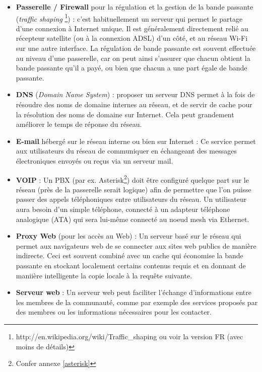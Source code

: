\documentclass[a4paper,french,11pt,twoside]{article}
\begin{document}
\medskip
\begin{itemize}
\renewcommand{\labelitemi}{$\bullet$}
     \item{\textbf{Passerelle / Firewall} pour la régulation et la gestion de la bande passante (\textit{traffic shaping} \footnote{http://en.wikipedia.org/wiki/Traffic\_shaping ou voir la version FR (avec moins de détails)}) : c'est habituellement un serveur qui permet le partage d'une connexion à Internet unique. Il est généralement directement relié au récepteur satellite (ou à la connexion ADSL) d'un côté, et au réseau Wi-Fi sur une autre interface. La régulation de bande passante est souvent effectuée au niveau d'une passerelle, car on peut ainsi s'assurer que chacun obtient la bande passante qu'il a payé, ou bien que chacun a une part égale de bande passante.}
     \item{\textbf{DNS} (\textit{Domain Name System}) : proposer un serveur DNS permet à la fois de résoudre des noms de domaine internes au réseau, et de servir de cache pour la résolution des noms de domaine sur Internet. Cela peut grandement améliorer le temps de réponse du réseau.}
     \item{\textbf{E-mail} hébergé sur le réseau interne ou bien sur Internet : Ce service permet aux utilisateurs du réseau de communiquer en échangeant des messages électroniques envoyés ou reçus via un serveur mail.}
     \item{\textbf{VOIP} : Un PBX (par ex. Asterisk\footnote{Confer annexe \ref{asterisk}}) doit être configuré quelque part sur le réseau (près de la passerelle serait logique) afin de permettre que l'on puisse passer des appels téléphoniques entre utilisateurs du réseau. Un utilisateur aura besoin d'un simple téléphone, connecté à un adapteur téléphone analogique (ATA) qui sera lui-même connecté au noeud mesh via Ethernet.}
     \item{\textbf{Proxy Web} (pour les accès au Web) : Un serveur basé sur le réseau qui permet aux navigateurs web de se connecter aux sites web publics de manière indirecte. Ceci est souvent combiné avec un cache qui économise la bande passante en stockant localement certains contenus requis et en donnant de maniière intelligente la copie locale à la requête suivante. }
     \item{\textbf{Serveur web} : Un serveur web peut faciliter l'échange d'informations entre les membres de la communauté, comme par exemple des services proposés par des membres ou les informations nécessaires pour les contacter.}
\end{itemize}
\end{document}
